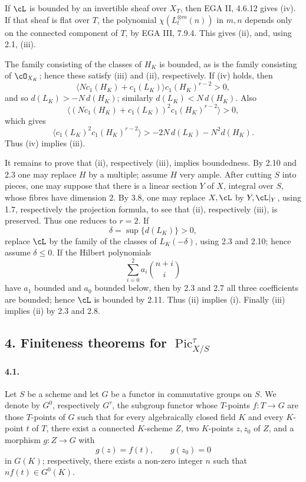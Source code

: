 \documentclass[11pt]{article}
\theoremstyle{plain}
\theoremstyle{definition}
\theoremstyle{remark}
\DeclareMathOperator{\Pic}{Pic}
\begin{document}
If $\cL$ is bounded by an invertible sheaf over $X_T$, then EGA II, 4.6.12 gives (iv). If that sheaf is flat over $T$, the polynomial $\chi(L_t^{\otimes m}(n))$ in $m,n$ depends only on the connected component of $T$, by EGA III, 7.9.4. This gives (ii), and, using 2.1, (iii).

The family consisting of the classes of $H_K$ is bounded, as is the family consisting of $\cO_{X_K}$; hence these satisfy (iii) and (ii), respectively. If (iv) holds, then
\[
\langle N c_1(H_K)+c_1(L_K)\rangle c_1(H_K)^{r-2}>0,
\]
and so $d(L_K)>-N\,d(H_K)$; similarly $d(L_K)<N\,d(H_K)$. Also
\[
\langle (N c_1(H_K)+c_1(L_K))^2c_1(H_K)^{r-2}\rangle>0,
\]
which gives
\[
\langle c_1(L_K)^2c_1(H_K)^{r-2}\rangle
  > -2N\,d(L_K)-N^2d(H_K).
\]
Thus (iv) implies (iii).

It remains to prove that (ii), respectively (iii), implies boundedness. By 2.10 and 2.3 one may replace $H$ by a multiple; assume $H$ very ample. After cutting $S$ into pieces, one may suppose that there is a linear section $Y$ of $X$, integral over $S$, whose fibres have dimension $2$. By 3.8, one may replace $X,\cL$ by $Y,\cL|_Y$, using 1.7, respectively the projection formula, to see that (ii), respectively (iii), is preserved. Thus one reduces to $r=2$. If
\[
\delta=\sup\{d(L_K)\}>0,
\]
replace $\cL$ by the family of the classes of $L_K(-\delta)$, using 2.3 and 2.10; hence assume $\delta\leq 0$. If the Hilbert polynomials
\[
\sum_{i=0}^2 a_i\binom{n+i}{i}
\]
have $a_1$ bounded and $a_0$ bounded below, then by 2.3 and 2.7 all three coefficients are bounded; hence $\cL$ is bounded by 2.11. Thus (ii) implies (i). Finally (iii) implies (ii) by 2.3 and 2.8.

\subsection*{4. Finiteness theorems for $\Pic^\tau_{X/S}$}

\paragraph{4.1.}
Let $S$ be a scheme and let $G$ be a functor in commutative groups on $S$. We denote by $G^0$, respectively $G^\tau$, the subgroup functor whose $T$-points $f:T\to G$ are those $T$-points of $G$ such that for every algebraically closed field $K$ and every $K$-point $t$ of $T$, there exist a connected $K$-scheme $Z$, two $K$-points $z,z_0$ of $Z$, and a morphism $g:Z\to G$ with
\[
g(z)=f(t),\qquad g(z_0)=0
\]
in $G(K)$; respectively, there exists a non-zero integer $n$ such that $n f(t)\in G^0(K)$.
\end{document}
